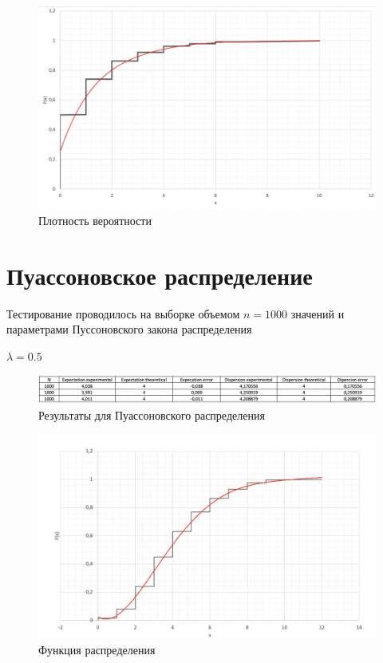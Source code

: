 \documentclass{article}
\begin{document}
		\begin{figure}[!htb]
			\includegraphics[scale = 0.32]{geom/1.png}
			\caption{Плотность вероятности}
   		\end{figure}
   	\newpage
	
	\section{Пуассоновское распределение}
		Тестирование проводилось на выборке объемом $n = 1000$ значений и параметрами Пуссоновского закона распределения
		\begin{center}
			$\lambda = 0.5$\\
		\end{center}
		\begin{center}
			\begin{figure}[!htb]
				\includegraphics [scale = 0.46] {poisson/3.png}
				\caption{Результаты для Пуассоновского распределения}
			\end{figure}
		\end{center}
		
		\begin{figure}[!htb]
		    \includegraphics[scale = 0.33]{poisson/2.png}
    		\caption{Функция распределения}
		\end{figure}
		 	 	
\end{document}
